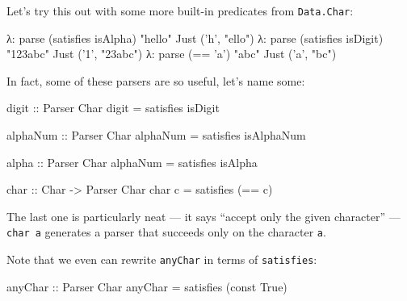\documentclass[]{article}
\newenvironment{Shaded}{}{}
\newcommand{\DataTypeTok}[1]{\textcolor[rgb]{0.56,0.13,0.00}{{#1}}}
\newcommand{\CharTok}[1]{\textcolor[rgb]{0.25,0.44,0.63}{{#1}}}
\newcommand{\StringTok}[1]{\textcolor[rgb]{0.25,0.44,0.63}{{#1}}}
\newcommand{\OtherTok}[1]{\textcolor[rgb]{0.00,0.44,0.13}{{#1}}}
\newcommand{\FunctionTok}[1]{\textcolor[rgb]{0.02,0.16,0.49}{{#1}}}
\newcommand{\NormalTok}[1]{{#1}}
\begin{document}
Let's try this out with some more built-in predicates from \texttt{Data.Char}:

\begin{Shaded}
\begin{Highlighting}[]
\NormalTok{λ}\FunctionTok{:} \NormalTok{parse (satisfies isAlpha) }\StringTok{"hello"}
\DataTypeTok{Just} \NormalTok{(}\CharTok{'h'}\NormalTok{, }\StringTok{"ello"}\NormalTok{)}
\NormalTok{λ}\FunctionTok{:} \NormalTok{parse (satisfies isDigit) }\StringTok{"123abc"}
\DataTypeTok{Just} \NormalTok{(}\CharTok{'1'}\NormalTok{, }\StringTok{"23abc"}\NormalTok{)}
\NormalTok{λ}\FunctionTok{:} \NormalTok{parse (}\FunctionTok{==} \CharTok{'a'}\NormalTok{) }\StringTok{"abc"}
\DataTypeTok{Just} \NormalTok{(}\CharTok{'a'}\NormalTok{, }\StringTok{"bc"}\NormalTok{)}
\end{Highlighting}
\end{Shaded}

In fact, some of these parsers are so useful, let's name some:

\begin{Shaded}
\begin{Highlighting}[]
\OtherTok{digit ::} \DataTypeTok{Parser} \DataTypeTok{Char}
\NormalTok{digit }\FunctionTok{=} \NormalTok{satisfies isDigit}

\OtherTok{alphaNum ::} \DataTypeTok{Parser} \DataTypeTok{Char}
\NormalTok{alphaNum }\FunctionTok{=} \NormalTok{satisfies isAlphaNum}

\OtherTok{alpha ::} \DataTypeTok{Parser} \DataTypeTok{Char}
\NormalTok{alphaNum }\FunctionTok{=} \NormalTok{satisfies isAlpha}

\OtherTok{char ::} \DataTypeTok{Char} \OtherTok{->} \DataTypeTok{Parser} \DataTypeTok{Char}
\NormalTok{char c }\FunctionTok{=} \NormalTok{satisfies (}\FunctionTok{==} \NormalTok{c)}
\end{Highlighting}
\end{Shaded}

The last one is particularly neat --- it says ``accept only the given
character'' --- \texttt{char\ \textquotesingle{}a\textquotesingle{}} generates a
parser that succeeds only on the character \texttt{a}.

Note that we even can rewrite \texttt{anyChar} in terms of \texttt{satisfies}:

\begin{Shaded}
\begin{Highlighting}[]
\OtherTok{anyChar ::} \DataTypeTok{Parser} \DataTypeTok{Char}
\NormalTok{anyChar }\FunctionTok{=} \NormalTok{satisfies (const }\DataTypeTok{True}\NormalTok{)}
\end{Highlighting}
\end{Shaded}
\end{document}

